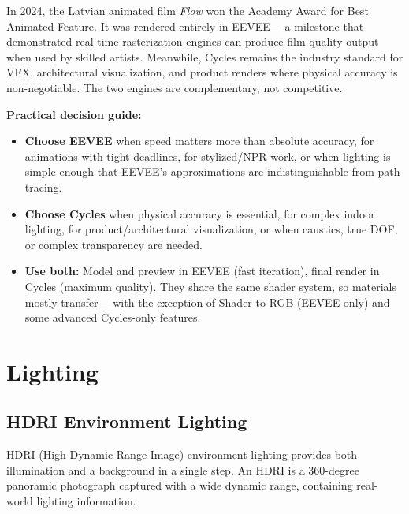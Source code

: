 \begin{historynote}
In 2024, the Latvian animated film \textit{Flow} won the Academy
Award for Best Animated Feature. It was rendered entirely in EEVEE---
a milestone that demonstrated real-time rasterization engines can
produce film-quality output when used by skilled artists. Meanwhile,
Cycles remains the industry standard for VFX, architectural
visualization, and product renders where physical accuracy is
non-negotiable. The two engines are complementary, not competitive.
\end{historynote}

\textbf{Practical decision guide:}
\begin{itemize}[leftmargin=2em]
  \item \textbf{Choose EEVEE} when speed matters more than absolute
        accuracy, for animations with tight deadlines, for
        stylized/NPR work, or when lighting is simple enough that
        EEVEE's approximations are indistinguishable from path tracing.
  \item \textbf{Choose Cycles} when physical accuracy is essential,
        for complex indoor lighting, for product/architectural
        visualization, or when caustics, true DOF, or complex
        transparency are needed.
  \item \textbf{Use both:} Model and preview in EEVEE (fast
        iteration), final render in Cycles (maximum quality). They
        share the same shader system, so materials mostly transfer---
        with the exception of Shader to RGB (EEVEE only) and some
        advanced Cycles-only features.
\end{itemize}


\section{Lighting}
\label{sec:shading:lighting}

\subsection{HDRI Environment Lighting}

HDRI (High Dynamic Range Image) environment lighting provides both
illumination and a background in a single step. An HDRI is a
360-degree panoramic photograph captured with a wide dynamic range,
containing real-world lighting information.


